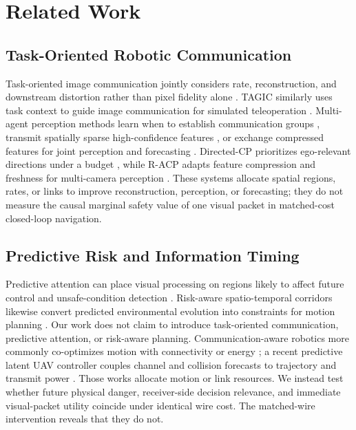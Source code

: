 \documentclass[letterpaper,10pt,conference]{ieeeconf}
\begin{document}
\section{Related Work}

\subsection{Task-Oriented Robotic Communication}
Task-oriented image communication jointly considers rate, reconstruction, and
downstream distortion rather than pixel fidelity alone \cite{liu2022task}.
TAGIC similarly uses task context to guide image communication for simulated
teleoperation \cite{diao2024tagic}. Multi-agent perception methods learn when
to establish communication groups \cite{liu2020when2com}, transmit spatially
sparse high-confidence features \cite{hu2022where2comm}, or exchange compressed
features for joint perception and forecasting \cite{wang2020v2vnet}.
Directed-CP prioritizes ego-relevant directions under a budget
\cite{tao2025directedcp}, while R-ACP adapts feature compression and freshness
for multi-camera perception \cite{fang2025racp}. These systems allocate spatial
regions, rates, or links to improve reconstruction, perception, or forecasting;
they do not measure the causal marginal safety value of one visual packet in
matched-cost closed-loop navigation.

\subsection{Predictive Risk and Information Timing}
Predictive attention can place visual processing on regions likely to affect
future control and unsafe-condition detection \cite{lee2020perceptual}.
Risk-aware spatio-temporal corridors likewise convert predicted environmental
evolution into constraints for motion planning \cite{chen2023rast}. Our work
does not claim to introduce task-oriented communication, predictive attention,
or risk-aware planning. Communication-aware robotics more commonly co-optimizes
motion with connectivity or energy \cite{muralidharan2021communication}; a recent
predictive latent UAV controller couples channel and collision forecasts to
trajectory and transmit power \cite{shiri2026crpl}. Those works allocate motion
or link resources. We instead test whether future physical danger,
receiver-side decision relevance, and immediate visual-packet utility coincide
under identical wire cost. The matched-wire intervention reveals that they do
not.
\end{document}
